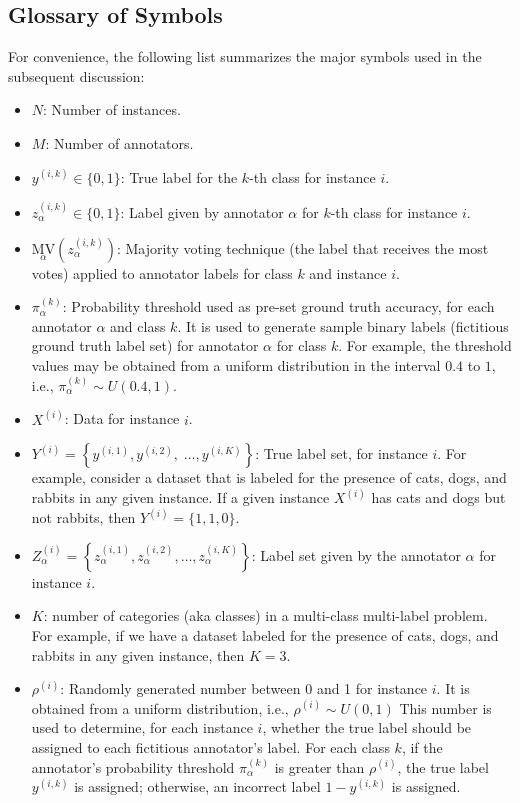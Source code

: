 \subsection{Glossary of Symbols}
For convenience, the following list summarizes the major symbols used in the subsequent discussion:
\begin{itemize}[itemsep=1em]
\renewcommand{\textbullet}{}
    \item  $N$: Number of instances.
    \item  $M$: Number of annotators.
    \item  $y^{(i,k)} \in \{0,1\} $: True label for the $k $-th class for instance $i $.
    \item  $z_\alpha^{(i,k)} \in \{0,1\} $: Label given by annotator $\alpha $ for $k $-th class for instance $i $.
    \item  ${{\underset\alpha{\mathrm{MV}}}{\left(z_\alpha^{(i,k)}\right)}} $: Majority voting technique (the label that receives the most votes) applied to annotator labels for class $k $ and instance $i $.
    \item  $\pi_\alpha^{(k)} $: Probability threshold used as pre-set ground truth accuracy, for each annotator $\alpha$ and class $k$. It is used to generate sample binary labels (fictitious ground truth label set) for annotator $\alpha $ for class $k $. For example, the threshold values may be obtained from a uniform distribution in the interval $0.4 $ to $1 $, i.e., $\pi_\alpha^{(k)} \sim U(0.4,1) $.
    \item  $X^{(i)} $: Data for instance $i$.
    \item  $Y^{(i)}=\left\{y^{(i,1)},y^{(i,2)},\;\dots,y^{(i,K)}\right\} $: True label set, for instance $i $. For example, consider a dataset that is labeled for the presence of cats, dogs, and rabbits in any given instance. If a given instance $X^{(i)} $ has cats and dogs but not rabbits, then $Y^{(i)}=\{1,1,0\} $.
    \item  $Z_{\alpha}^{(i)}=\left\{z_\alpha^{(i,1)}, z_\alpha^{(i,2)}, \dots, z_\alpha^{(i,K)}\right\} $: Label set given by the annotator $\alpha $ for instance $i $.
    \item $K$: number of categories (aka classes) in a multi-class multi-label problem. For example, if we have a dataset labeled for the presence of cats, dogs, and rabbits in any given instance, then $K=3$.
    \item  $\rho^{(i)}$: Randomly generated number  between 0 and 1 for instance $i $. It is obtained from a uniform distribution, i.e., $\rho^{(i)} \sim U(0,1) $ This number is used to determine, for each instance $i$, whether the true label should be assigned to each fictitious annotator's label. For each class $k$, if the annotator's probability threshold $\pi_\alpha^{(k)}$ is greater than $\rho^{(i)}$, the true label $y^{(i,k)}$ is assigned; otherwise, an incorrect label $1 - y^{(i,k)}$  is assigned.

\end{itemize}
